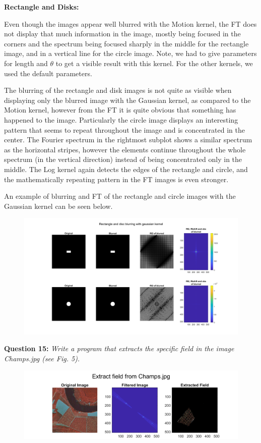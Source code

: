 \textbf{Rectangle and Disks:}

Even though the images appear well blurred with the Motion kernel, the FT does not display that much information in the image, mostly being focused in the corners and the spectrum being focused sharply in the middle for the rectangle image, and in a vertical line for the circle image. Note, we had to give parameters for length and $\theta$ to get a visible result with this kernel. For the other kernels, we used the default parameters.

The blurring of the rectangle and disk images is not quite as visible when displaying only the blurred image with the Gaussian kernel, as compared to the Motion kernel, however from the FT it is quite obvious that something has happened to the image. Particularly the circle image displays an  interesting pattern that seems to repeat throughout the image and is concentrated in the center. The Fourier spectrum in the rightmost subplot shows a similar spectrum as the horizontal stripes, however the elements continue throughout the whole spectrum (in the vertical direction) instead of being concentrated only in the middle. The Log kernel again detects the edges of the rectangle and circle, and the mathematically repeating pattern in the FT images is even stronger.

An example of blurring and FT of the rectangle and circle images with the Gaussian kernel can be seen below.

\begin{figure}[H]
    \centering
    \includegraphics[width=0.75\linewidth]{Doc/Graphics/Part1/Q14e.png}
\end{figure}

\textbf{Question 15:}
\textit{Write a program that extracts the speciﬁc ﬁeld in the image Champs.jpg (see Fig. 5).}


\begin{figure}[H]
    \centering
    \includegraphics[width=\linewidth]{Doc/Graphics/Part1/Part1_Question15.png}
    \label{fig:enter-label}
\end{figure}


